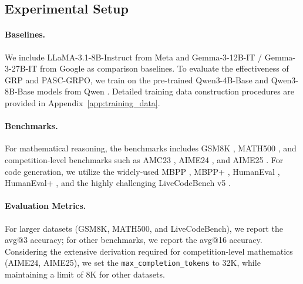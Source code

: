
\subsection{Experimental Setup}

\paragraph{Baselines.} We include LLaMA-3.1-8B-Instruct from Meta \cite{Dubey2024TheL3} and Gemma-3-12B-IT / Gemma-3-27B-IT from Google \cite{Kamath2025Gemma3T} as comparison baselines.  
To evaluate the effectiveness of GRP and PASC-GRPO, we train on the pre-trained Qwen3-4B-Base and Qwen3-8B-Base models from Qwen \cite{Yang2025Qwen3TR}. Detailed training data construction procedures are provided in Appendix~\ref{app:training_data}.

\paragraph{Benchmarks.} For mathematical reasoning, the benchmarks includes GSM8K \cite{Cobbe2021TrainingVT}, MATH500 \cite{Lightman2023LetsVS}, and competition-level benchmarks such as AMC23 \cite{amc23_dataset}, AIME24 \cite{aime24_dataset}, and AIME25 \cite{aime25_dataset}. For code generation, we utilize the widely-used MBPP \cite{Austin2021ProgramSW}, MBPP+ \cite{Liu2023IsYC}, HumanEval \cite{Chen2021EvaluatingLL}, HumanEval+ \cite{Liu2023IsYC}, and the highly challenging LiveCodeBench v5 \cite{Jain2024LiveCodeBenchHA}.

\paragraph{Evaluation Metrics.} For larger datasets (GSM8K, MATH500, and LiveCodeBench), we report the avg@3 accuracy; for other benchmarks, we report the avg@16 accuracy. Considering the extensive derivation required for competition-level mathematics (AIME24, AIME25), we set the \texttt{max\_completion\_tokens} to 32K, while maintaining a limit of 8K for other datasets.


